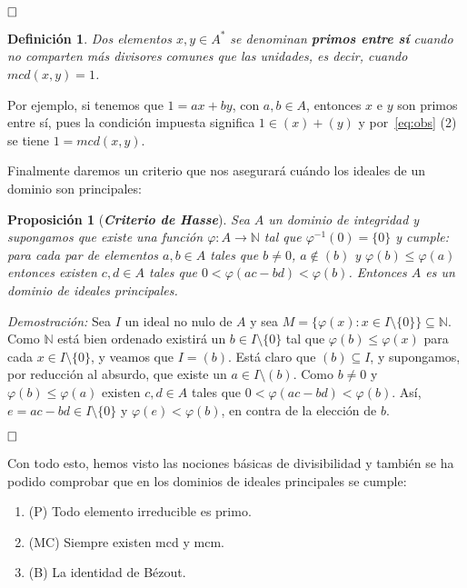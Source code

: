 \documentclass[12pt]{article}
\newtheorem{proposition}[theorem]{Proposición}
\newtheorem{definition}[theorem]{Definición}
\begin{document}
$\hfill \square$

\begin{definition} Dos elementos $x,y \in A^{\ast}$ se denominan \textbf{primos entre sí} cuando no comparten más divisores comunes que las unidades, es decir, cuando $mcd(x,y) = 1$.
\end{definition}

Por ejemplo, si tenemos que $1 = ax+by$, con $a,b \in A$, entonces $x$ e $y$ son primos entre sí, pues la condición impuesta significa $1 \in (x)+(y)$ y por~\ref{eq:obs} (2) se tiene $1 = mcd(x,y)$.

Finalmente daremos un criterio que nos asegurará cuándo los ideales de un dominio son principales: 

\begin{proposition}[\textbf{\textit{Criterio de Hasse}}] Sea $A$ un dominio de integridad y supongamos que existe una función $\varphi \colon A \longrightarrow \mathbb{N}$ tal que $\varphi^{-1}(0) = \lbrace 0 \rbrace$ y cumple: para cada par de elementos $a,b \in A$ tales que $b \neq 0$, $a \notin (b)$ y $\varphi(b) \leq \varphi(a)$ entonces existen $c,d \in A$ tales que $0 < \varphi(ac-bd) < \varphi (b)$. Entonces $A$ es un dominio de ideales principales.
\end{proposition}
\emph{Demostración: }Sea $I$ un ideal no nulo de $A$ y sea $M = \lbrace \varphi(x) : x \in I \setminus \lbrace 0 \rbrace \rbrace \subseteq \mathbb{N}$. Como $\mathbb{N}$ está bien ordenado existirá un $b \in I \setminus \lbrace 0 \rbrace$ tal que $\varphi(b) \leq \varphi(x)$ para cada $x \in I \setminus \lbrace 0 \rbrace$, y veamos que $I = (b)$. Está claro que $(b) \subseteq I$, y supongamos, por reducción al absurdo, que existe un $a \in I \setminus (b)$. Como $b \neq 0$ y $\varphi(b) \leq \varphi(a)$ existen $c,d \in A$ tales que $0 < \varphi(ac-bd) < \varphi(b)$. Así, $e = ac-bd \in I \setminus \lbrace 0 \rbrace$ y $\varphi (e) < \varphi(b)$, en contra de la elección de $b$.

$\hfill \square$

Con todo esto, hemos visto las nociones básicas de divisibilidad y también se ha podido comprobar que en los dominios de ideales principales se cumple: 

\begin{enumerate}
\item (P) Todo elemento irreducible es primo.
\item (MC) Siempre existen mcd y mcm.
\item (B) La identidad de Bézout.
\end{enumerate}
\end{document}
